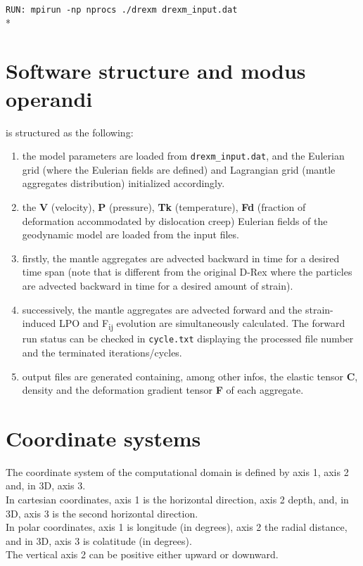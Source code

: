 \texttt{RUN: mpirun -np nprocs ./drexm drexm\_input.dat}\\*

\section{Software structure and modus operandi}
\drexmtitle{} is structured as the following:
\begin{enumerate}
    \item the \drexmtitle{} model parameters are loaded from \texttt{drexm\_input.dat}, and the Eulerian grid (where the Eulerian fields are defined) and Lagrangian grid (mantle aggregates distribution) initialized accordingly. 
    \item the \textbf{V} (velocity), \textbf{P} (pressure), \textbf{Tk} (temperature), \textbf{Fd} (fraction of deformation accommodated by dislocation creep) Eulerian fields of the geodynamic model are loaded from the input \vtptitle{} files. 
    \item firstly, the mantle aggregates are advected backward in time for a desired time span (note that is different from the original D-Rex where the particles are advected backward in time for a desired amount of strain).
    \item successively, the mantle aggregates are advected forward and the strain-induced LPO and F\textsubscript{ij} evolution are simultaneously calculated. The forward run status can be checked in \texttt{cycle.txt} displaying the processed \vtptitle{} file number and the terminated iterations/cycles.  
    \item output \cijkltitle{} files are generated containing, among other infos, the elastic tensor \textbf{C}, density and the deformation gradient tensor \textbf{F} of each aggregate. 
\end{enumerate}

\section{Coordinate systems}
The coordinate system of the \drexmtitle{} computational domain is defined by axis 1, axis 2 and, in 3D, axis 3.\\
In cartesian coordinates, axis 1 is the horizontal direction, axis 2 depth, and, in 3D, axis 3 is the second horizontal direction.\\
In polar coordinates, axis 1 is longitude (in degrees), axis 2 the radial distance, and in 3D, axis 3 is colatitude (in degrees).\\
The vertical axis 2 can be positive either upward or downward.

